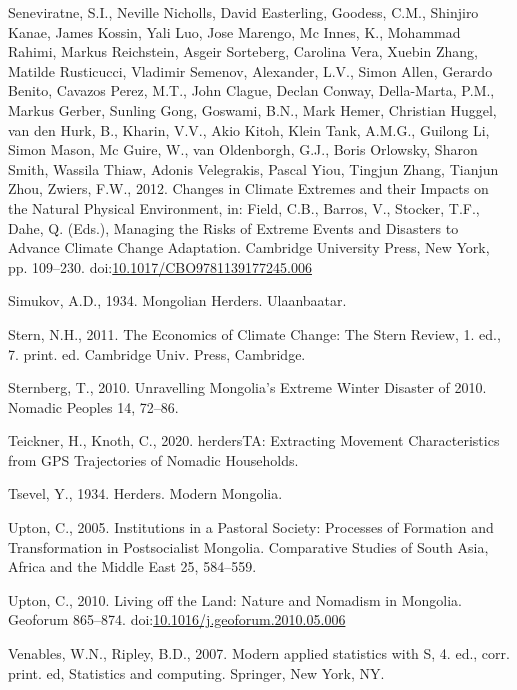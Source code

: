 \documentclass[]{elsarticle} %
\newlength{\cslhangindent}
\newenvironment{cslreferences}%
  {\setlength{\parindent}{0pt}%
  \everypar{\setlength{\hangindent}{\cslhangindent}}\ignorespaces}%
  {\par}
\begin{document}
\begin{cslreferences}
\leavevmode\hypertarget{ref-Seneviratne.2012}{}%
Seneviratne, S.I., Neville Nicholls, David Easterling, Goodess, C.M.,
Shinjiro Kanae, James Kossin, Yali Luo, Jose Marengo, Mc Innes, K.,
Mohammad Rahimi, Markus Reichstein, Asgeir Sorteberg, Carolina Vera,
Xuebin Zhang, Matilde Rusticucci, Vladimir Semenov, Alexander, L.V.,
Simon Allen, Gerardo Benito, Cavazos Perez, M.T., John Clague, Declan
Conway, Della-Marta, P.M., Markus Gerber, Sunling Gong, Goswami, B.N.,
Mark Hemer, Christian Huggel, van den Hurk, B., Kharin, V.V., Akio
Kitoh, Klein Tank, A.M.G., Guilong Li, Simon Mason, Mc Guire, W., van
Oldenborgh, G.J., Boris Orlowsky, Sharon Smith, Wassila Thiaw, Adonis
Velegrakis, Pascal Yiou, Tingjun Zhang, Tianjun Zhou, Zwiers, F.W.,
2012. Changes in Climate Extremes and their Impacts on the Natural
Physical Environment, in: Field, C.B., Barros, V., Stocker, T.F., Dahe,
Q. (Eds.), Managing the Risks of Extreme Events and Disasters to Advance
Climate Change Adaptation. Cambridge University Press, New York, pp.
109--230.
doi:\href{https://doi.org/10.1017/CBO9781139177245.006}{10.1017/CBO9781139177245.006}

\leavevmode\hypertarget{ref-Simukov.1934}{}%
Simukov, A.D., 1934. Mongolian Herders. Ulaanbaatar.

\leavevmode\hypertarget{ref-Stern.2011}{}%
Stern, N.H., 2011. The Economics of Climate Change: The Stern Review, 1.
ed., 7. print. ed. Cambridge Univ. Press, Cambridge.

\leavevmode\hypertarget{ref-Sternberg.2010}{}%
Sternberg, T., 2010. Unravelling Mongolia's Extreme Winter Disaster of
2010. Nomadic Peoples 14, 72--86.

\leavevmode\hypertarget{ref-Teickner.2020}{}%
Teickner, H., Knoth, C., 2020. herdersTA: Extracting Movement
Characteristics from GPS Trajectories of Nomadic Households.

\leavevmode\hypertarget{ref-Tsevel.1934}{}%
Tsevel, Y., 1934. Herders. Modern Mongolia.

\leavevmode\hypertarget{ref-Upton.2005}{}%
Upton, C., 2005. Institutions in a Pastoral Society: Processes of
Formation and Transformation in Postsocialist Mongolia. Comparative
Studies of South Asia, Africa and the Middle East 25, 584--559.

\leavevmode\hypertarget{ref-Upton.2010}{}%
Upton, C., 2010. Living off the Land: Nature and Nomadism in Mongolia.
Geoforum 865--874.
doi:\href{https://doi.org/10.1016/j.geoforum.2010.05.006}{10.1016/j.geoforum.2010.05.006}

\leavevmode\hypertarget{ref-Venables.2007}{}%
Venables, W.N., Ripley, B.D., 2007. Modern applied statistics with S, 4.
ed., corr. print. ed, Statistics and computing. Springer, New York, NY.


\end{cslreferences}
\end{document}
